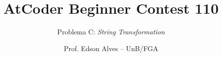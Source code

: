 \title{AtCoder Beginner Contest 110}
\subtitle{Problema C: \textit{String Transformation}}
\author{Prof. Edson Alves -- UnB/FGA}
\date{}
